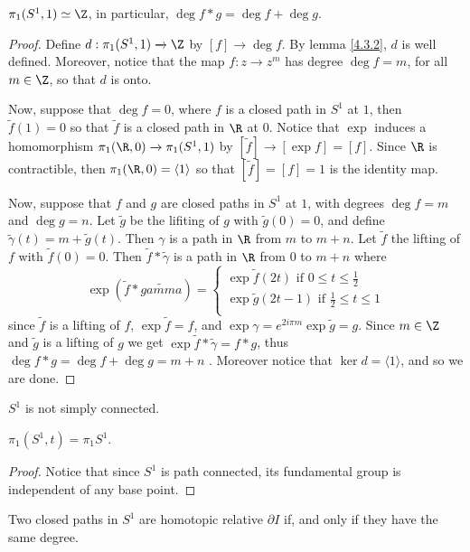 \begin{theorem}\label{4.3.3}
    $\pi_1(S^1,1) \simeq \Z$, in particular, $\deg{f \ast g}=\deg{f}+\deg{g}$.
\end{theorem}
\begin{proof}
    Define $d:\pi_1(S^1,1) \xrightarrow{} \Z$ by $[f] \xrightarrow{} \deg{f}$.
    By lemma \ref{4.3.2}, $d$ is well defined. Moreover, notice that the map
    $f:z \xrightarrow{} z^m$ has degree $\deg{f}=m$, for all $m \in \Z$, so that
     $d$ is onto.

     Now, suppose that  $\deg{f}=0$, where $f$ is a closed path in  $S^1$ at
     $1$, then $\tilde{f}(1)=0$ so that $\tilde{f}$ is a closed path in $\R$ at
     $0$. Notice that  $\exp$ induces a homomorphism $\pi_1(\R,0) \xrightarrow{}
     \pi_1(S^1,1)$ by $[\tilde{f}] \xrightarrow{} [\exp{f}]=[f]$. Since $\R$ is
     contractible, then  $\pi_1(\R,0)=\langle 1 \rangle$ so that
     $[\tilde{f}]=[f]=1$ is the identity map.

     Now, suppose that $f$ and  $g$ are closed paths in $S^1$ at $1$, with
     degrees  $\deg{f}=m$ and $\deg{g}=n$. Let $\tilde{g}$ be the lifiting of
     $g$ with  $\tilde{g}(0)=0$, and define $\tilde{\gamma}(t)=m+\tilde{g}(t)$.
     Then $\gamma$ is a path in  $\R$ from  $m$ to  $m+n$. Let  $\tilde{f}$ the
     lifting of $f$ with  $\tilde{f}(0)=0$. Then $\tilde{f} \ast \tilde{\gamma}$
     is a path in $\R$ from  $0$ to  $m+n$ where
     \begin{equation*}
         \exp{(\tilde{f} \ast \tilde{gamma})}=\begin{cases}
                \exp{\tilde{f}(2t)} \text{ if } 0 \leq t \leq \frac{1}{2}   \\
                \exp{\tilde{g}(2t-1)} \text{ if } \frac{1}{2} \leq t \leq 1  \\
                                           \end{cases}
     \end{equation*}
     since $\tilde{f}$ is a lifting of $f$,  $\exp{\tilde{f}}=f$, and
     $\exp{\gamma}=e^{2i\pi m}\exp{\tilde{g}}=g$. Since $m \in \Z$ and
     $\tilde{g}$ is a lifting of $g$ we get  $\exp{\tilde{f} \ast
     \tilde{\gamma}}=f \ast g$, thus $\deg{f \ast g}=\deg{f}+\deg{g}=m+n$ .
     Moreover notice that $\ker{d}=\langle 1 \rangle$, and so we are done.
\end{proof}
\begin{corollary}
    $S^1$ is not simply connected.
\end{corollary}
\begin{corollary}
    $\pi_1(S^1,t)=\pi_1{S^1}$.
\end{corollary}
\begin{proof}
    Notice that since $S^1$ is path connected, its fundamental group is
    independent of any base point.
\end{proof}
\begin{corollary}
    Two closed paths in $S^1$ are homotopic relative  $\partial{I}$ if, and only
    if they have the same degree.
\end{corollary}

